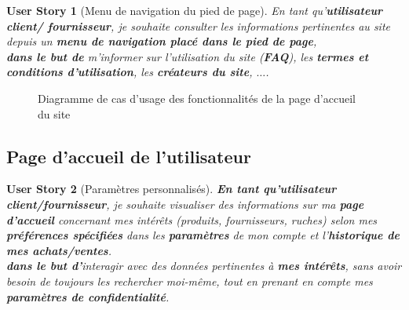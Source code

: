 \documentclass[a4paper,12pt]{report}
\theoremstyle{break}
\newtheorem*{userStory}{User Story}
\theoremstyle{break}
\theoremstyle{break}
\theoremstyle{break}
\theoremstyle{definition}
\theoremstyle{remark}
\begin{document}
\begin{userStory}[Menu de navigation du pied de page]
En tant qu'\textbf{utilisateur} \textbf{{\color{green} client}/{\color{red} fournisseur}}, je souhaite consulter les informations pertinentes au site depuis un \textbf{menu de navigation placé dans le pied de page},\\
\indent
\textbf{dans le but de} m'informer sur l'utilisation du site (\textbf{FAQ}), les \textbf{termes et conditions d'utilisation}, les \textbf{créateurs du site}, $\dots$.
\end{userStory}

\begin{figure}[!ht]
  \centering
  \caption{Diagramme de cas d'usage des fonctionnalités de la page d'accueil du site}
  \label{fig:index_page_case_diagram}
\end{figure}

\subsection{Page d'accueil de l'utilisateur}
\begin{userStory}[Paramètres personnalisés]
\textbf{En tant qu'utilisateur {\color{green}client}/{\color{red}fournisseur}}, je souhaite visualiser des informations sur ma \textbf{page d'accueil} concernant mes intérêts (produits, fournisseurs, ruches) selon mes \textbf{préférences spécifiées} dans les \textbf{paramètres} de mon compte et l'\textbf{historique de mes achats/ventes}.\\
\indent
\textbf{dans le but d'}interagir avec des données pertinentes à \textbf{mes intérêts}, sans avoir besoin de toujours les rechercher moi-même, tout en prenant en compte mes \textbf{paramètres de confidentialité}.
\end{userStory}
\end{document}

